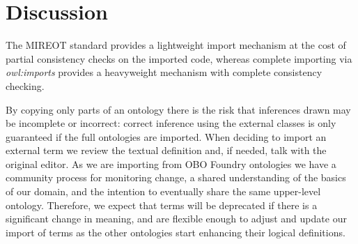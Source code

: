 \documentclass[a4paper,10pt,twocolumn]{article}
\begin{document}


\section*{Discussion}

The MIREOT standard provides a lightweight import mechanism at the cost of partial consistency checks on the imported code, whereas complete importing via \textit{owl:imports} provides a heavyweight mechanism with complete consistency checking.

By copying only parts of an ontology there is the risk that inferences drawn may be incomplete or incorrect: correct inference using the external classes is only guaranteed if the full ontologies are imported.
When deciding to import an external term we review the textual definition and, if needed, talk with the original editor.
As we are importing from OBO Foundry ontologies we have a community process for monitoring change, a shared understanding of the basics of our domain, and the intention to eventually share the same upper-level ontology. 
Therefore, we expect that terms will be deprecated if there is a significant change in meaning, and are flexible enough to adjust and update our import of terms as the other ontologies start enhancing their logical definitions.
\end{document}
